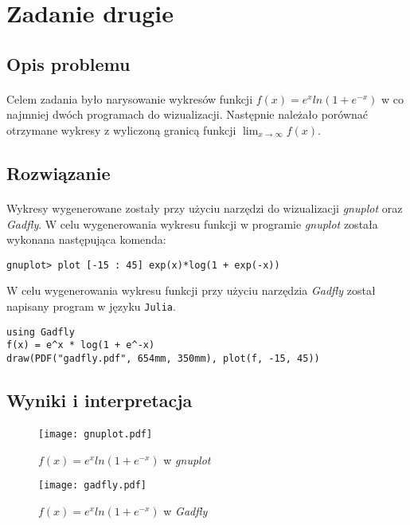 \documentclass[a4paper]{article}
\begin{document}
\section{Zadanie drugie}

\subsection{Opis problemu}
\paragraph{}
Celem zadania było narysowanie wykresów funkcji $f(x) = e^xln(1 + e^{-x})$ w co najmniej dwóch programach do wizualizacji. Następnie należało porównać otrzymane wykresy z wyliczoną granicą funkcji $\lim_{x \to \infty} f(x)$.

\subsection{Rozwiązanie}
\paragraph{}
Wykresy wygenerowane zostały przy użyciu narzędzi do wizualizacji \textit{gnuplot} oraz \textit{Gadfly}.
W celu wygenerowania wykresu funkcji w programie \textit{gnuplot} została wykonana następująca komenda:
\begin{center}
\texttt{gnuplot> plot [-15 : 45] exp(x)*log(1 + exp(-x))}
\end{center}

W celu wygenerowania wykresu funkcji przy użyciu narzędzia \textit{Gadfly} został napisany program w języku \texttt{Julia}.
\begin{center}
\begin{lstlisting}[frame = single]
using Gadfly
f(x) = e^x * log(1 + e^-x)
draw(PDF("gadfly.pdf", 654mm, 350mm), plot(f, -15, 45))
\end{lstlisting}
\end{center}

\subsection{Wyniki i interpretacja}
\paragraph{}
\begin{figure}[htbp]
  \centering
  \texttt{[image: gnuplot.pdf]}
  \caption{$f(x) = e^xln(1 + e^{-x})$ w \textit{gnuplot}}
\end{figure}
\clearpage
\begin{figure}[htbp]
  \centering
  \texttt{[image: gadfly.pdf]}
  \caption{$f(x) = e^xln(1 + e^{-x})$ w \textit{Gadfly}}
\end{figure}
\end{document}
